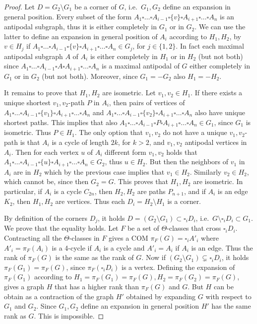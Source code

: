 \documentclass[final,11pt]{article}
\begin{document}
\begin{proof}
Let $D = G_2\setminus G_1$ be a corner of $G$, i.e.~$G_1, G_2$ define an expansion in general position.
Every subset of the form $A_1 \square \ldots \square A_{i-1} \square \{v\} \square A_{i+1} \square \ldots  \square A_n$ is an antipodal subgraph, thus it is either completely in $G_1$ or in $G_2$. We can use the latter to define an expansion in general position of $A_i$ according to $H_1, H_2$, by $v\in H_j$ if $A_1 \square \ldots \square A_{i-1} \square \{v\} \square A_{i+1} \square \ldots  \square A_n \in G_j$, for $j\in\{1,2\}$. In fact each maximal antipodal subgraph $A$ of $A_i$ is either completely in $H_1$ or in $H_2$ (but not both) since 
$A_1 \square \ldots \square A_{i-1} \square A \square A_{i+1} \square \ldots  \square A_n$
is a maximal antipodal of $G$ either completely in $G_1$ or in $G_2$ (but not both). Moreover, since $G_1 = -G_2$ also $H_1= -H_2$.

It remains to prove that $H_1, H_2$ are isometric. Let $v_1, v_2 \in H_1$. If there exists a unique shortest $v_1,v_2$-path $P$ in $A_i$, then pairs of vertices of $A_1 \square \ldots \square A_{i-1} \square \{v_1\} \square A_{i+1} \square \ldots  \square A_n$ and $A_1 \square \ldots \square A_{i-1} \square \{v_2\} \square A_{i+1} \square \ldots  \square A_n$ also have unique shortest paths. This implies that also $A_1 \square \ldots \square A_{i-1} \square P \square A_{i+1} \square \ldots  \square A_n \in G_1$, since $G_1$ is isometric. Thus $P\in H_1$. The only option that $v_1, v_2$ do not have a unique $v_1,v_2$-path is that $A_i$ is a cycle of length $2k$, for $k>2$, and $v_1, v_2$ antipodal vertices in $A_i$. Then for each vertex $u$ of $A_i$ different form $v_1,v_2$ holds that $A_1 \square \ldots \square A_{i-1} \square \{u\} \square A_{i+1} \square \ldots  \square A_n  \in G_2$, thus $u\in H_2$. But then the neighbors of $v_1$ in $A_i$ are in $H_2$ which by the previous case implies that  $v_1 \in H_2$. Similarly $v_2 \in H_2$, which cannot be, since then $G_2 = G$. This proves that $H_1, H_2$ are isometric. In particular, if $A_i$ is a cycle $C_{2n}$, then $H_2, H_2$ are paths $P_{n+1}$, and if $A_i$ is an edge $K_2$, then $H_1, H_2$ are vertices. Thus each $D_i = H_2\setminus H_1$ is a corner.

By definition of the corners $D_j$, it holds $D = (G_2\setminus G_1) \subset  \square_i D_i$, i.e.~$G\setminus\square_i D_i \subset G_1$. We prove that the equality holds. Let $F$ be a set of $\Theta$-classes that cross $\square_i D_i$. Contracting all the $\Theta$-classes in $F$ gives a COM $\pi_F(G)=  \square_i A'_i$ where $A'_i = \pi_F(A_i)$ is a 4-cycle if $A_i$ is a cycle and $A'_i = A_i$ if $A_i$ is an edge. Thus the rank of $\pi_F(G)$ is the same as the rank of $G$. Now if $(G_2\setminus G_1) \subsetneq  \square_i D_i$, it holds $\pi_F(G_1) = \pi_F(G)$, since $\pi_F(\square_i D_i)$ is a vertex. Defining the expansion of $\pi_F(G_1)$ according to $H_1=\pi_F(G_1)=\pi_F(G), H_2 = \pi_F(G_2)=\pi_F(G)$, gives a graph $H$ that has a higher rank than $\pi_F(G)$ and $G$. But $H$ can be obtain as a contraction of the graph $H'$ obtained by expanding $G$ with respect to $G_1$ and $G_2$. Since $G_1, G_2$ define an expansion in general position $H'$ has the same rank as $G$. This is impossible.


\end{proof}
\end{document}
